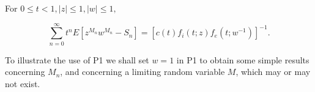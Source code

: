For $0 \leq t < 1, |z| \leq 1, |w| \leq 1,$

$$\sum_{n=0}^{\infty} t^n E[z^{M_n}w^{M_n}-S_n] = [c(t)f_i(t;z)f_e(t;w^{-1})]^{-1}.$$

To illustrate the use of P1 we shall set $w = 1$ in P1 to obtain some simple results concerning $M_n$, and concerning a limiting random variable $M$, which may or may not exist.